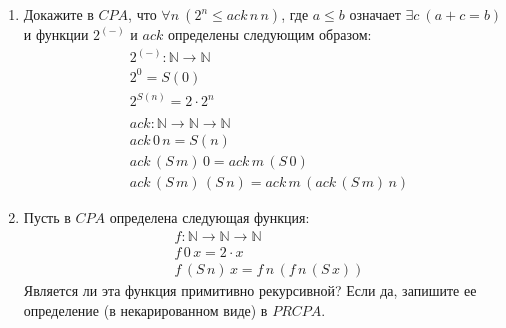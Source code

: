 \begin{enumerate}
\item Докажите в $CPA$, что $\forall n\ (2^n \leq ack\,n\,n)$, где $a \leq b$ означает $\exists c\ (a + c = b)$ и функции $2^{(-)}$ и $ack$ определены следующим образом:
\begin{align*}
& 2^{(-)} : \mathbb{N} \to \mathbb{N} \\
& 2^0 = S(0) \\
& 2^{S(n)} = 2 \cdot 2^n \\
& \\
& ack : \mathbb{N} \to \mathbb{N} \to \mathbb{N} \\
& ack\,0\,n = S(n) \\
& ack\,(S\,m)\,0 = ack\,m\,(S\,0) \\
& ack\,(S\,m)\,(S\,n) = ack\,m\,(ack\,(S\,m)\,n)
\end{align*}

\item Пусть в $CPA$ определена следующая функция:
\begin{align*}
& f : \mathbb{N} \to \mathbb{N} \to \mathbb{N} \\
& f\,0\,x = 2 \cdot x \\
& f\,(S\,n)\,x = f\,n\,(f\,n\,(S\,x))
\end{align*}
Является ли эта функция примитивно рекурсивной? Если да, запишите ее определение (в некарированном виде) в $PRCPA$.

\end{enumerate}
